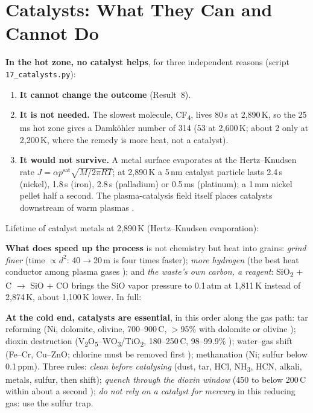 \documentclass[11pt,a4paper]{article}
\begin{document}
\section{Catalysts: What They Can and Cannot Do}\label{ch:catalysts}
\textbf{In the hot zone, no catalyst helps}, for three independent reasons (script \texttt{17\_catalysts.py}):
\begin{enumerate}
\item \textbf{It cannot change the outcome} (Result~8).
\item \textbf{It is not needed.} The slowest molecule, CF\textsubscript{4}, lives 80\,\textmu s at 2,890\,K, so the 25\,ms hot zone gives a Damk\"ohler number of 314 (53 at 2,600\,K; about 2 only at 2,200\,K, where the remedy is more heat, not a catalyst).
\item \textbf{It would not survive.} A metal surface evaporates at the Hertz--Knudsen rate $J = \alpha p^{\text{sat}}\sqrt{M/2\pi RT}$; at 2,890\,K a 5\,nm catalyst particle lasts 2.4\,\textmu s (nickel), 1.8\,\textmu s (iron), 2.8\,\textmu s (palladium) or 0.5\,ms (platinum); a 1\,mm nickel pellet half a second. The plasma-catalysis field itself places catalysts downstream of warm plasmas \citep{bogaerts2020}.
\end{enumerate}
\noindent Lifetime of catalyst metals at 2,890\,K (Hertz--Knudsen evaporation):

\textbf{What does speed up the process} is not chemistry but heat into grains: \emph{grind finer} (time $\propto d^2$: 40$\to$20\,\textmu m is four times faster); \emph{more hydrogen} (the best heat conductor among plasma gases \citep{mauer2025}); and \emph{the waste's own carbon, a reagent}: SiO\textsubscript{2} + C $\to$ SiO + CO brings the SiO vapor pressure to 0.1\,atm at 1,811\,K instead of 2,874\,K, about 1,100\,K lower. In full:


\textbf{At the cold end, catalysts are essential}, in this order along the gas path: tar reforming (Ni, dolomite, olivine, 700--900\,\textdegree C, $>$95\% with dolomite or olivine \citep{jayanarasimhan2024}); dioxin destruction (V\textsubscript{2}O\textsubscript{5}--WO\textsubscript{3}/TiO\textsubscript{2}, 180--250\,\textdegree C, 98--99.9\% \citep{neuwahl2019}); water--gas shift (Fe--Cr, Cu--ZnO; chlorine must be removed first \citep{argyle2015}); methanation (Ni; sulfur below 0.1\,ppm). Three rules: \emph{clean before catalysing} (dust, tar, HCl, NH\textsubscript{3}, HCN, alkali, metals, sulfur, then shift); \emph{quench through the dioxin window} (450 to below 200\,\textdegree C within about a second \citep{epa2006dioxin}); \emph{do not rely on a catalyst for mercury} in this reducing gas: use the sulfur trap.
\end{document}
